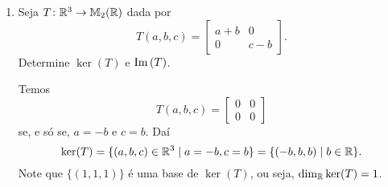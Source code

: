 \begin{exemplos}
    \begin{enumerate}[label={\arabic*})]
        \item Seja $T \colon \mathbb{R}^3 \to \mathbb{M}_2(\mathbb{R})$ dada por
        \[
            T(a,b,c) = \begin{bmatrix}
                a + b & 0\\
                0 & c - b
            \end{bmatrix}.
        \]
        Determine $\ker(T)$ e ${\rm Im\,}(T)$.
        \begin{solucao}
            Temos
            \[
                T(a,b,c) = \begin{bmatrix}
                0 & 0\\
                0 & 0
                \end{bmatrix}
            \]
            se, e s\'o se, $a = -b$ e $c = b$. Daí
            \[
                \ker(T) = \{(a,b,c) \in \mathbb{R}^3 \mid a = -b, c = b\} = \{(-b,b,b) \mid b \in \mathbb{R}\}.
            \]
            Note que $\{(1,1,1)\}$ é uma base de $\ker(T)$, ou seja, $\dim_{\mathbb{R}} \ker(T) = 1$.


\end{solucao}
\end{enumerate}
\end{exemplos}
